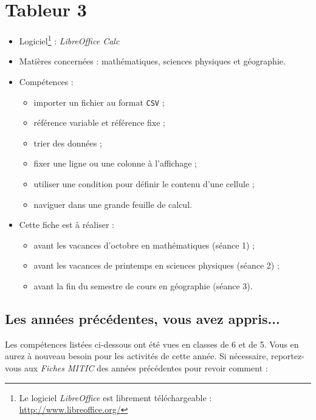 \chapter{Tableur 3}  

{\footnotesize
\begin{itemize}
\item Logiciel\footnote{Le logiciel \emph{LibreOffice} est librement téléchargeable : \url{http://www.libreoffice.org/}} : \emph{LibreOffice Calc}
\item Matières concernées : mathématiques, sciences physiques et géographie.
\item Compétences : 
        \begin{itemize}
        \item importer un fichier au format \texttt{CSV} ;
        \item référence variable et référence fixe ;
        \item trier des données ;
	\item fixer une ligne ou une colonne à l'affichage ;
	\item utiliser une condition pour définir le contenu d'une cellule ;
	\item naviguer dans une grande feuille de calcul.
        \end{itemize}
\item Cette fiche est à réaliser :
        \begin{itemize}
        \item avant les vacances d'octobre en mathématiques (séance 1) ;
        \item avant les vacances de printemps en sciences physiques (séance 2) ;
        \item avant la fin du semestre de cours en géographie (séance 3). 
        \end{itemize}
\end{itemize}
}%


\section*{Les années précédentes, vous avez appris...}

Les compétences listées ci-dessous ont été vues en classes de 6 et de 5. Vous en aurez à nouveau besoin pour les activités de cette année. Si nécessaire, reportez-vous aux \emph{Fiches MITIC} des années précédentes pour revoir comment :  

